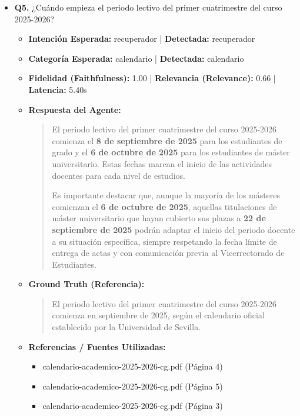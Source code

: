 \documentclass[12pt,a4paper,oneside]{report}
\begin{document}
\begin{itemize}
  
\item \textbf{Q5.} ¿Cuándo empieza el periodo lectivo del primer cuatrimestre del curso 2025-2026? \\
        \begin{itemize}
          \item \textbf{Intención Esperada:} recuperador | \textbf{Detectada:} recuperador
          \item \textbf{Categoría Esperada:} calendario | \textbf{Detectada:} calendario
          \item \textbf{Fidelidad (Faithfulness):} 1.00 | \textbf{Relevancia (Relevance):} 0.66 | \textbf{Latencia:} 5.40s
          \item \textbf{{Respuesta del Agente:}} \\
                \begin{quote}
El periodo lectivo del primer cuatrimestre del curso 2025-2026 comienza el \textbf{8 de septiembre de 2025} para los estudiantes de grado y el \textbf{6 de octubre de 2025} para los estudiantes de máster universitario. Estas fechas marcan el inicio de las actividades docentes para cada nivel de estudios.

Es importante destacar que, aunque la mayoría de los másteres comienzan el \textbf{6 de octubre de 2025}, aquellas titulaciones de máster universitario que hayan cubierto sus plazas a \textbf{22 de septiembre de 2025} podrán adaptar el inicio del periodo docente a su situación específica, siempre respetando la fecha límite de entrega de actas y con comunicación previa al Vicerrectorado de Estudiantes.
                \end{quote}
          \item \textbf{{Ground Truth (Referencia):}} \\
                \begin{quote}
El periodo lectivo del primer cuatrimestre del curso 2025-2026 comienza en septiembre de 2025, según el calendario oficial establecido por la Universidad de Sevilla.
                \end{quote}
          \item \textbf{{Referencias / Fuentes Utilizadas:}} \\
                \begin{itemize}
                  \item calendario-academico-2025-2026-cg.pdf (Página 4)
                  \item calendario-academico-2025-2026-cg.pdf (Página 5)
                  \item calendario-academico-2025-2026-cg.pdf (Página 3)
                \end{itemize}
        \end{itemize}


\end{itemize}
\end{document}
